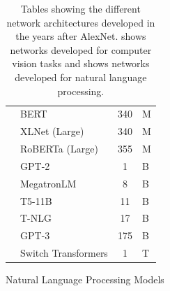 \begin{table}[t]
\begin{subfigure}[b]{\textwidth}
\begin{tabular}{
      L{4.5cm}
      L{4.5cm}
      S[table-format=3.0, table-text-alignment=left]@{\,}
      s[table-unit-alignment=left]
    }
      \citet{devlin2019bert}         & BERT            & 340 & \si{M} \\
      \citet{yang2019xlnet}          & XLNet (Large)   & 340 & \si{M} \\
      \citet{liu2019roberta}         & RoBERTa (Large) & 355 & \si{M} \\
      \citet{radford2019language}    & GPT-2           &   1 & \si{B} \\
      \citet{shoeybi2019megatron}    & MegatronLM      &   8 & \si{B} \\
      \citet{raffel2020exploring}    & T5-11B          &  11 & \si{B} \\
      \citet{rosset2020turingnlg}    & T-NLG           &  17 & \si{B} \\
      \citet{brown2020language}      & GPT-3           & 175 & \si{B} \\
      \citet{fedus2021switch}        & Switch Transformers & 1 & \si{T} \\
      \bottomrule
    \end{tabular}
    \caption{Natural Language Processing Models}
    \label{table:ch1-networks_parameters_nlp}
  \end{subfigure}
  \caption{
    Tables showing the different network architectures developed in the years after AlexNet.
     shows networks developed for computer vision tasks and  shows networks developed for natural language processing.
  }
  \label{table:ch1-networks_parameters}
\end{table}


